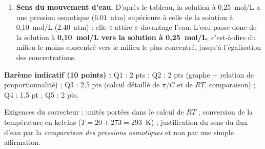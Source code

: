 \documentclass[11pt]{article}
\begin{document}
\begin{corrige}
\begin{enumerate}
\item \textbf{Sens du mouvement d'eau.} D'après le tableau, la solution à 0,25~mol/L a une pression osmotique ($\num{6,01}$~atm) supérieure à celle de la solution à 0,10~mol/L ($\num{2,40}$~atm) : elle « attire » davantage l'eau. L'eau passe donc de la solution à \textbf{0,10~mol/L vers la solution à 0,25~mol/L}, c'est-à-dire du milieu le moins concentré vers le milieu le plus concentré, jusqu'à l'égalisation des concentrations.
\end{enumerate}
\textbf{Barème indicatif (10 points) :} Q1 : 2 pts ; Q2 : 2 pts (graphe + relation de proportionnalité) ; Q3 : 2,5 pts (calcul détaillé de $\pi/C$ et de $RT$, comparaison) ; Q4 : 1,5 pt ; Q5 : 2 pts.
\end{corrige}

\begin{attention}
Exigences du correcteur : unités portées dans le calcul de $RT$ ; conversion de la température en kelvins ($T = 20 + 273 = 293$~K) ; justification du sens du flux d'eau par la \emph{comparaison des pressions osmotiques} et non par une simple affirmation.
\end{attention}
\end{document}
